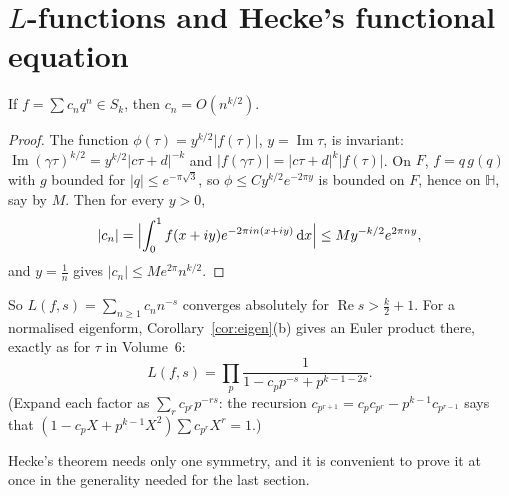\section{$L$-functions and Hecke's functional equation}

\begin{proposition}\label{prop:heckebound}
If $f=\sum c_nq^n\in S_k$, then $c_n=O(n^{k/2})$.
\end{proposition}
\begin{proof}
The function $\phi(\tau)=y^{k/2}|f(\tau)|$, $y=\operatorname{Im}\tau$, is invariant: $\operatorname{Im}(\gamma\tau)^{k/2}=y^{k/2}|c\tau+d|^{-k}$ and
$|f(\gamma\tau)|=|c\tau+d|^k|f(\tau)|$. On $F$, $f=q\,g(q)$ with $g$ bounded for $|q|\le e^{-\pi\sqrt3}$, so $\phi\le Cy^{k/2}e^{-2\pi y}$ is bounded on $F$, hence on $\mathbb H$,
say by $M$. Then for every $y>0$,
\[
|c_n|=\Bigl|\int_0^1f(x+iy)e^{-2\pi in(x+iy)}\,\mathrm dx\Bigr|\le My^{-k/2}e^{2\pi ny},
\]
and $y=\frac1n$ gives $|c_n|\le Me^{2\pi}n^{k/2}$.
\end{proof}

So $L(f,s)=\sum_{n\ge1}c_nn^{-s}$ converges absolutely for $\operatorname{Re}s>\frac k2+1$. For a normalised eigenform, Corollary~\ref{cor:eigen}(b) gives an Euler product
there, exactly as for $\tau$ in Volume~6:
\[
L(f,s)=\prod_p\frac1{1-c_pp^{-s}+p^{k-1-2s}}.
\]
(Expand each factor as $\sum_rc_{p^r}p^{-rs}$: the recursion $c_{p^{r+1}}=c_pc_{p^r}-p^{k-1}c_{p^{r-1}}$ says that $(1-c_pX+p^{k-1}X^2)\sum c_{p^r}X^r=1$.)

Hecke's theorem needs only one symmetry, and it is convenient to prove it at once in the generality needed for the last section.

